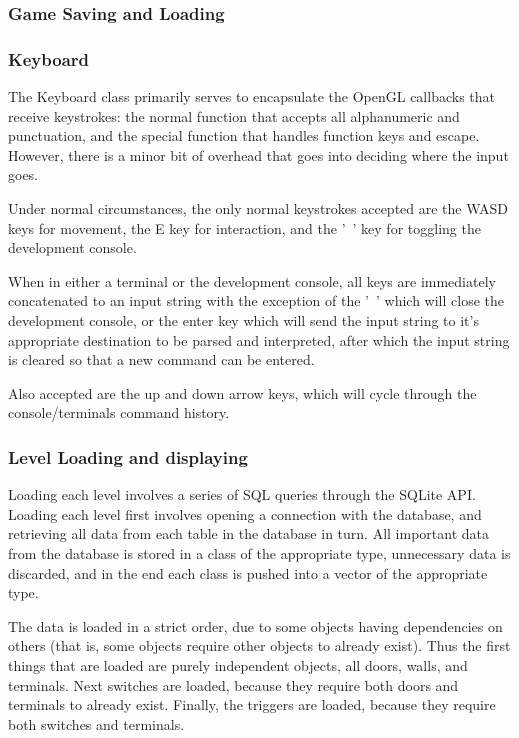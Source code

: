 \documentclass{article}
\begin{document}
\subsubsection{Game Saving and Loading}

\subsubsection{Keyboard}
The Keyboard class primarily serves to encapsulate the OpenGL callbacks that receive keystrokes: the normal function that accepts all alphanumeric and punctuation, and the special function that handles function keys and escape. However, there is a minor bit of overhead that goes into deciding where the input goes.

Under normal circumstances, the only normal keystrokes accepted are the WASD keys for movement, the E key for interaction, and the '~' key for toggling the development console.

When in either a terminal or the development console, all keys are immediately concatenated to an input string with the exception of the '~' which will close the development console, or the enter key which will send the input string to it's appropriate destination to be parsed and interpreted, after which the input string is cleared so that a new command can be entered.

Also accepted are the up and down arrow keys, which will cycle through the console/terminals command history.

\subsubsection{Level Loading and displaying}
Loading each level involves a series of SQL queries through the SQLite API. Loading each level first involves opening a connection with the database, and retrieving all data from each table in the database in turn. All important data from the database is stored in a class of the appropriate type, unnecessary data is discarded, and in the end each class is pushed into a vector of the appropriate type. 

The data is loaded in a strict order, due to some objects having dependencies on others (that is, some objects require other objects to already exist). Thus the first things that are loaded are purely independent objects, all doors, walls, and terminals. Next switches are loaded, because they require both doors and terminals to already exist. Finally, the triggers are loaded, because they require both switches and terminals.
\end{document}
